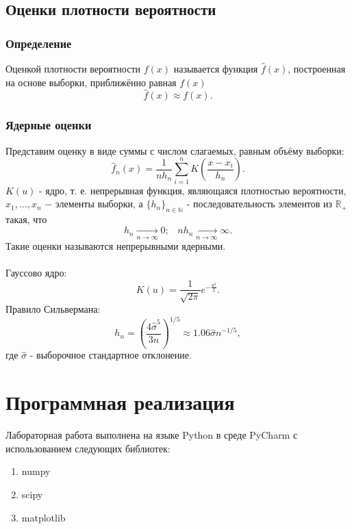 \documentclass[a4paper]{article}
\begin{document}
\subsection{Оценки плотности вероятности}
\subsubsection{Определение}
\noindent Оценкой плотности вероятности $f(x)$ называется функция $\widehat{f}(x)$, построенная на основе выборки, приближённо равная $f(x)$
\begin{equation}
    \widehat{f}(x)\approx f(x).
\end{equation}
\subsubsection{Ядерные оценки}
\noindent Представим оценку в виде суммы с числом слагаемых, равным объёму выборки:
\begin{equation}
    \widehat{f}_n(x)=\frac{1}{n h_n}\sum_{i=1}^n K\left(\frac{x-x_i}{h_n}\right).
\end{equation}
$K(u)$ - ядро, т. е. непрерывная функция, являющаяся плотностью вероятности, $x_1,...,x_n$ $-$ элементы выборки, а $\{h_n\}_{n\in\mathbb{N}}$ - последовательность элементов из $\mathbb{R}_+$ такая, что
\begin{equation}
    h_n\xrightarrow[n\to\infty]{}0;\;\;\;n h_n\xrightarrow[n\to\infty]{}\infty.
\end{equation}
Такие оценки называются непрерывными ядерными.\\\\
Гауссово ядро:
\begin{equation}
    K(u)=\frac{1}{\sqrt{2\pi}}e^{-\frac{u^2}{2}}.
\end{equation}
Правило Сильвермана:
\begin{equation}
    h_n=\left(\frac{4\hat{\sigma}^5}{3n}\right)^{1/5}\approx1.06\hat{\sigma}n^{-1/5},
\end{equation}
где $\hat{\sigma}$ - выборочное стандартное отклонение.

\section{Программная реализация}
Лабораторная работа выполнена на языке Python в среде PyCharm с использованием следующих библиотек:
\begin{enumerate}
    \item numpy
    \item scipy
    \item matplotlib
\end{enumerate}
\end{document}
